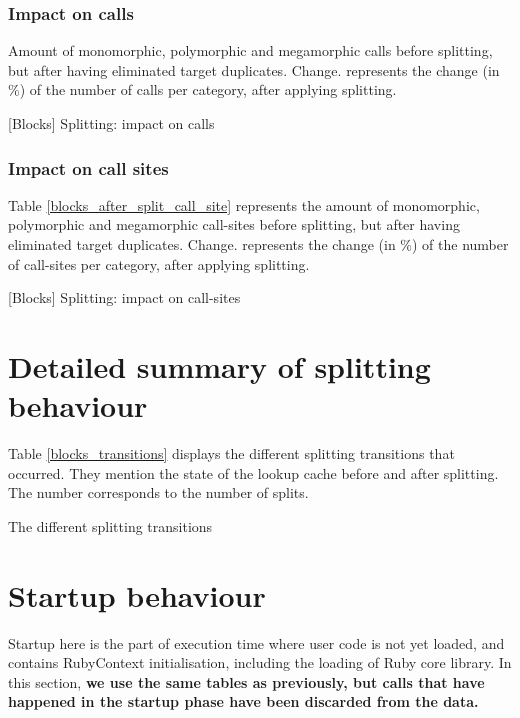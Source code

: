 \documentclass[preprint]{acmart}
\let\StartupBlocksBeforeAfterSplitCalls\BlocksBeforeAfterSplitCalls
\let\StartupBlocksBeforeAfterSplitSites\BlocksBeforeAfterSplitSites
\let\StartupBlocksSplittingTransitions\BlocksSplittingTransitions
\begin{document}
\subsubsection{\textbf{Impact on calls}}

Amount of monomorphic, polymorphic and megamorphic calls before splitting, but after having eliminated target duplicates.
Change. represents the change (in \%) of the number of calls per category, after applying splitting.

\begin{table}[h!]
	\centering	
	\StartupBlocksBeforeAfterSplitCalls
	\caption{[Blocks] Splitting: impact on calls}
\end{table}

\subsubsection{\textbf{Impact on call sites}}

Table \ref{blocks_after_split_call_site} represents the amount of monomorphic, polymorphic and megamorphic call-sites before splitting, but after having eliminated target duplicates.
Change. represents the change (in \%) of the number of call-sites per category, after applying splitting.

\begin{table}[h!]
	\centering
	\StartupBlocksBeforeAfterSplitSites
	\caption{[Blocks] Splitting: impact on call-sites}
	\label{blocks_after_split_call_site}
\end{table}

\section{Detailed summary of splitting behaviour}

Table \ref{blocks_transitions} displays the different splitting transitions that occurred. They mention the state of the lookup cache before and after splitting. The number corresponds to the number of splits.

\begin{table}[h!]
	\centering
	\StartupBlocksSplittingTransitions
	\caption{The different splitting transitions}
	\label{blocks_transitions}
\end{table}

\section{Startup behaviour}
Startup here is the part of execution time where user code is not yet loaded, and contains RubyContext initialisation, including the loading of Ruby core library. In this section, \textbf{we use the same tables as previously, but calls that have happened in the startup phase have been discarded from the data.}
\end{document}

